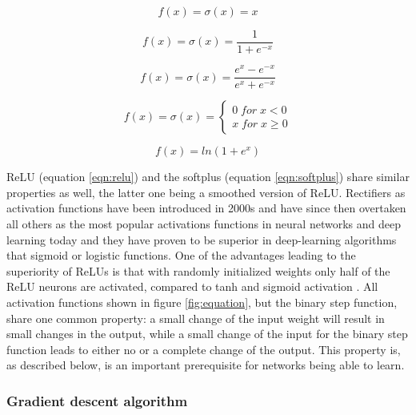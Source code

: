 \begin{equation}
  f(x) = \sigma(x) = x
  \label{eqn:ident}
\end{equation}

              
\begin{equation}
  f(x) = \sigma(x) =  \frac{1}{1+e^{-x}} 
  \label{eqn:sigmoid}
\end{equation}

\begin{equation}
  f(x) = \sigma(x) = \frac{e^x - e^{-x}}{e^x + e^{-x}}
  \label{eqn:tanh}
\end{equation}


\begin{equation}
  f(x)= \sigma(x) = \left\{
  \begin{array}{ll}
    0 \; for \; x < 0 \\ 
    x \; for \; x \geq 0
  \end{array}
\right .
\label{eqn:relu}
\end{equation}


\begin{equation}
  f(x) = ln(1+e^x)
  \label{eqn:softplus}
\end{equation}


ReLU (equation \ref{eqn:relu}) and the softplus (equation \ref{eqn:softplus}) share similar properties as
well, the latter one being a smoothed version of ReLU. Rectifiers as activation functions have been introduced
in 2000s \cite{hahnloser2000digital} and have since then overtaken all others as the most popular activations
functions in neural networks and deep learning today \cite{lecun2015deep} and they have proven to be superior
in deep-learning algorithms that sigmoid or logistic functions. One of the advantages leading to the
superiority of ReLUs is that with randomly initialized weights only half of the ReLU neurons are activated,
compared to tanh and sigmoid activation \cite{glorot2011deep}. All activation functions shown in figure
\ref{fig:equation}, but the binary step function, share one common property: a small change of the input
weight will result in small changes in the output, while a small change of the input for the binary step
function leads to either no or a complete change of the output.  This property is, as described below, is an
important prerequisite for networks being able to learn. \\

\subsubsection{Gradient descent algorithm}

